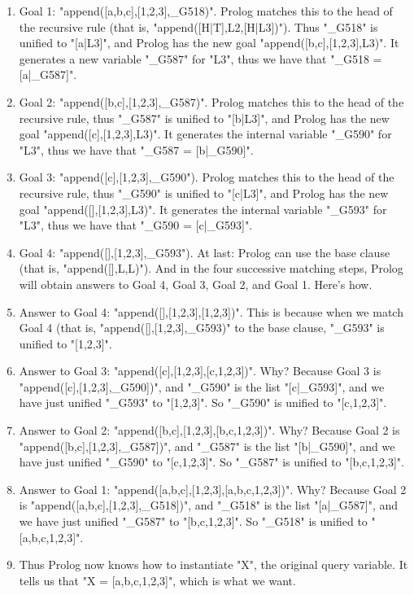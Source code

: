 \begin{enumerate}

\item{}Goal 1: "append([a,b,c],[1,2,3],_G518)".  Prolog
matches this to the head of the recursive rule (that is,
"append([H|T],L2,[H|L3])").  Thus "_G518" is unified to
"[a|L3]", and Prolog has the new goal
"append([b,c],[1,2,3],L3)".
It generates a new variable "_G587" for
"L3", thus we have that "_G518 = [a|_G587]".

\item{}Goal 2: "append([b,c],[1,2,3],_G587)".  Prolog matches
this to the head of the recursive rule, thus "_G587" is unified
to "[b|L3]", and Prolog has the new goal
"append([c],[1,2,3],L3)".
It generates the internal variable "_G590" for
"L3", thus we have that "_G587 = [b|_G590]".

\item{}Goal 3: "append([c],[1,2,3],_G590").  Prolog matches this
to the head of the recursive rule, thus "_G590" is unified  to
"[c|L3]", and Prolog has the new goal
"append([],[1,2,3],L3)".
It generates the internal variable "_G593" for "L3",
thus we have that "_G590 = [c|_G593]".

\item{}Goal 4: "append([],[1,2,3],_G593").  At last: Prolog
can use the base clause (that is, "append([],L,L)").  And in the
four successive matching steps, Prolog will obtain answers to Goal 4,
Goal 3, Goal 2, and Goal 1. Here's how.

\item{}Answer to Goal 4: "append([],[1,2,3],[1,2,3])". This
is because when we match Goal 4 (that is,
"append([],[1,2,3],_G593)" to the base clause, "_G593" is
unified to "[1,2,3]".

\item{}Answer to Goal 3: "append([c],[1,2,3],[c,1,2,3])".  Why?
Because Goal 3 is "append([c],[1,2,3],_G590])", and "_G590" is the
list "[c|_G593]", and we have just unified "_G593" to "[1,2,3]". So
"_G590" is unified to "[c,1,2,3]".

\item{}Answer to Goal 2: "append([b,c],[1,2,3],[b,c,1,2,3])".
Why? Because Goal 2 is "append([b,c],[1,2,3],_G587])", and
"_G587" is the list  "[b|_G590]", and we have just unified "_G590" to
"[c,1,2,3]". So "_G587" is unified to "[b,c,1,2,3]".

\item{}Answer to Goal 1: "append([a,b,c],[1,2,3],[a,b,c,1,2,3])".
Why? Because Goal 2 is "append([a,b,c],[1,2,3],_G518])",  and
"_G518" is the list "[a|_G587]", and we have just unified "_G587" to
"[b,c,1,2,3]". So "_G518" is unified to "[a,b,c,1,2,3]".

\item{}Thus Prolog now knows how to instantiate "X", the original
query variable.  It tells us that "X = [a,b,c,1,2,3]", which
is what we want.
\end{enumerate}


